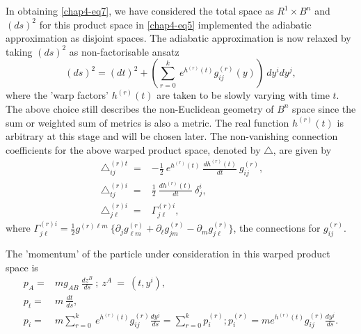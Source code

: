 In obtaining \eqref{chap4-eq7}, we have considered the total space as $R^1\times B^n$ and $(ds)^2$ for this product space in \eqref{chap4-eq5} implemented the adiabatic approximation as disjoint spaces. The adiabatic approximation is now relaxed by taking  $(ds)^2$ as non-factorisable ansatz 
\setcounter{equation}{8}
\begin{equation}
(ds)^2= (dt)^2+\left(\sum_{r=0}^k\ e^{h^{(r)}(t)}g_{ij}^{(r)}(y)\right)\ dy^idy^j,\label{chap4-eq9}
\end{equation}
where the 'warp factors' $h^{(r)}(t)$ are taken to be slowly varying with time $t$. The above choice still describes the  non-Euclidean geometry of $B^n$ space since the sum or weighted sum of metrics is also a metric. The real function $h^{(r)}(t)$  is arbitrary at this stage and will be chosen later. The non-vanishing connection coefficients for the above warped product  space, denoted by $\bigtriangleup$, are given by 
\begin{align}
{\bigtriangleup}^{(r) t}_{ij}= &-\frac{1}{2}\ e^{h^{(r)}(t)}\ \frac{dh^{(r)}(t)}{dt}\ g_{ij}^{(r)}, \nonumber \\
{\bigtriangleup}^{(r) i}_{tj}= &\frac{1}{2}\ \frac{dh^{(r)}(t)}{dt}\ {\delta}^i_j, \nonumber \\
{\bigtriangleup}^{(r) i}_{j\ell}= &{\Gamma}^{(r) i}_{j\ell},\label{chap4-eq10}
\end{align}
where ${\Gamma}^{(r) i}_{j\ell}=\frac{1}{2}g^{(r)\ell m}\ \{{\partial}_jg^{(r)}_{\ell m}+{\partial}_{\ell}g^{(r)}_{jm} 
-{\partial}_mg^{(r)}_{j\ell}\}$, the connections for $g_{ij}^{(r)}$. 

The 'momentum' of the particle under consideration in this warped product space is 
\begin{align}
p_A= &mg_{AB}\ \frac{dz^B}{ds}\ ;\ z^A\ =\ (t,y^i), \nonumber \\
p_t= &m\ \frac{dt}{ds}, \nonumber \\
p_i= &m\sum_{r=0}^k\ e^{h^{(r)}(t)}g_{ij}^{(r)}\frac{dy^j}{ds}=\sum_{r=0}^k p_i^{(r)}; p_i^{(r)}=me^{h^{(r)}(t)}
g_{ij}^{(r)}\frac{dy^j}{ds}.\label{chap4-eq11}
\end{align}

